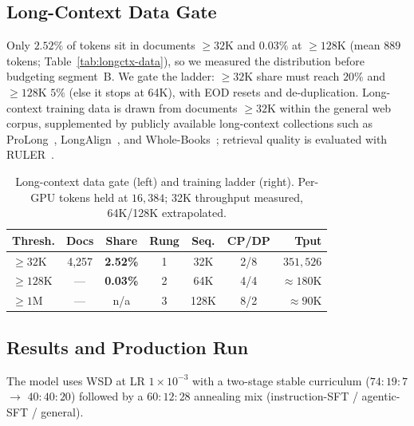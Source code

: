 \subsection{Long-Context Data Gate}\label{sec:longctx-data}
Only $\mathbf{2.52\%}$ of tokens sit in documents ${\geq}32$K and $0.03\%$ at ${\geq}128$K (mean $889$ tokens; Table~\ref{tab:longctx-data}), so we measured the distribution before budgeting segment~B.
We gate the ladder: ${\geq}32$K share must reach $20\%$ and ${\geq}128$K $5\%$ (else it stops at 64K), with EOD resets and de-duplication.
Long-context training data is drawn from documents ${\geq}32$K within the general web corpus, supplemented by publicly available long-context collections such as ProLong~\cite{gao2024prolong}, LongAlign~\cite{bai2024longalign}, and Whole-Books~\cite{ysngkil2026wholebooks}; retrieval quality is evaluated with RULER~\cite{hsieh2024ruler}.
\begin{table}[t]
\centering
\caption{Long-context data gate (left) and training ladder (right). Per-GPU tokens held at $16{,}384$; 32K throughput measured, 64K/128K extrapolated.}
\label{tab:longctx-data}
\label{tab:longctx-train}
\footnotesize
\setlength{\tabcolsep}{2pt}
\begin{tabular}{@{}lcc|cccr@{}}
\toprule
\textbf{Thresh.} & \textbf{Docs} & \textbf{Share} & \textbf{Rung} & \textbf{Seq.} & \textbf{CP/DP} & \textbf{Tput} \\
\midrule
${\geq}32$K & 4{,}257 & \textbf{2.52\%} & 1 & 32K & 2/8 & $351{,}526$ \\
${\geq}128$K & --- & \textbf{0.03\%} & 2 & 64K & 4/4 & ${\approx}180$K \\
${\geq}1$M & --- & n/a & 3 & 128K & 8/2 & ${\approx}90$K \\
\bottomrule
\end{tabular}
\end{table}

\subsection{Results and Production Run}\label{sec:llm-results}
The model uses WSD at LR $1\times10^{-3}$ with a two-stage stable curriculum ($74{:}19{:}7$ $\to$ $40{:}40{:}20$) followed by a $60{:}12{:}28$ annealing mix (instruction-SFT / agentic-SFT / general).


